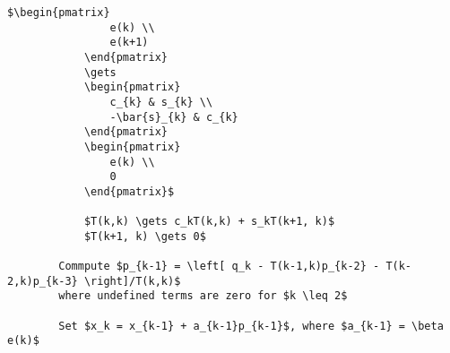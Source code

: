 \begin{lstlisting}[style=algo]
            $\begin{pmatrix}
                e(k) \\
                e(k+1)
            \end{pmatrix}
            \gets 
            \begin{pmatrix}
                c_{k} & s_{k} \\
                -\bar{s}_{k} & c_{k}
            \end{pmatrix}
            \begin{pmatrix}
                e(k) \\
                0
            \end{pmatrix}$

            $T(k,k) \gets c_kT(k,k) + s_kT(k+1, k)$
            $T(k+1, k) \gets 0$

        Commpute $p_{k-1} = \left[ q_k - T(k-1,k)p_{k-2} - T(k-2,k)p_{k-3} \right]/T(k,k)$
        where undefined terms are zero for $k \leq 2$

        Set $x_k = x_{k-1} + a_{k-1}p_{k-1}$, where $a_{k-1} = \beta e(k)$
\end{lstlisting}
